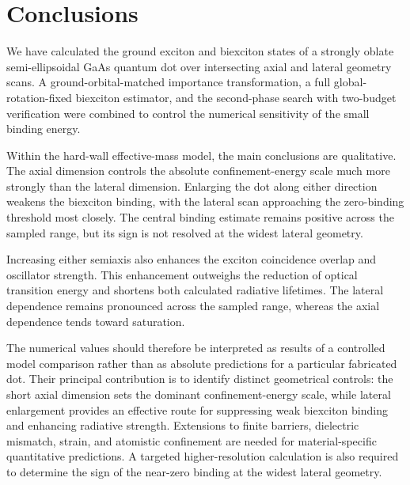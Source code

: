 \section{Conclusions}
\label{sec:conclusions}

We have calculated the ground exciton and biexciton states of a strongly
oblate semi-ellipsoidal GaAs quantum dot over intersecting axial and lateral
geometry scans. A ground-orbital-matched importance transformation, a full
global-rotation-fixed biexciton estimator, and the second-phase search with
two-budget verification were combined to control the numerical
sensitivity of the small binding energy.

Within the hard-wall effective-mass model, the main conclusions are
qualitative. The axial dimension controls the absolute confinement-energy
scale much more strongly than the lateral dimension. Enlarging the dot along
either direction weakens the biexciton binding, with the lateral scan
approaching the zero-binding threshold most closely. The central binding
estimate remains positive across the sampled range, but its sign is not
resolved at the widest lateral geometry.

Increasing either semiaxis also enhances the exciton coincidence overlap and
oscillator strength. This enhancement outweighs the reduction of optical
transition energy and shortens both calculated radiative lifetimes. The
lateral dependence remains pronounced across the sampled range, whereas the
axial dependence tends toward saturation.

The numerical values should therefore be interpreted as results of a
controlled model comparison rather than as absolute predictions for a
particular fabricated dot. Their principal contribution is to identify
distinct geometrical controls: the short axial dimension sets the dominant
confinement-energy scale, while lateral enlargement provides an effective
route for suppressing weak biexciton binding and enhancing radiative strength.
Extensions to finite barriers, dielectric mismatch, strain, and atomistic
confinement are needed for material-specific quantitative predictions. A
targeted higher-resolution calculation is also required to determine the sign
of the near-zero binding at the widest lateral geometry.
